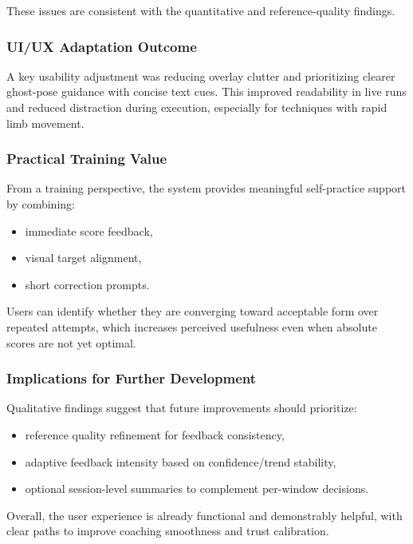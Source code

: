 \documentclass[12pt]{article}
\begin{document}
{These issues are consistent with the quantitative and reference-quality findings.

\subsubsection{UI/UX Adaptation Outcome}

A key usability adjustment was reducing overlay clutter and prioritizing clearer ghost-pose guidance with concise text cues. This improved readability in live runs and reduced distraction during execution, especially for techniques with rapid limb movement.

\subsubsection{Practical Training Value}

From a training perspective, the system provides meaningful self-practice support by combining:

\begin{itemize}
    \item immediate score feedback,
    \item visual target alignment,
    \item short correction prompts.
\end{itemize}

Users can identify whether they are converging toward acceptable form over repeated attempts, which increases perceived usefulness even when absolute scores are not yet optimal.

\subsubsection{Implications for Further Development}

Qualitative findings suggest that future improvements should prioritize:

\begin{itemize}
    \item reference quality refinement for feedback consistency,
    \item adaptive feedback intensity based on confidence/trend stability,
    \item optional session-level summaries to complement per-window decisions.
\end{itemize}

Overall, the user experience is already functional and demonstrably helpful, with clear paths to improve coaching smoothness and trust calibration.

}
\end{document}
